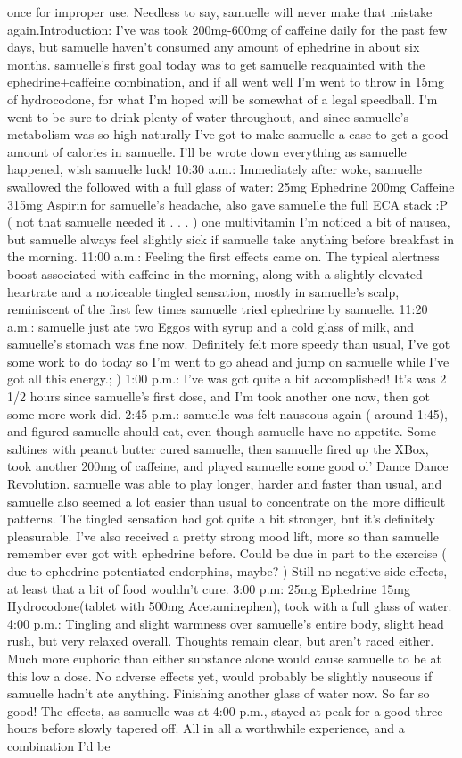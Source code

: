 \documentclass[12pt]{book}
\begin{document}
once for improper use. Needless to say, samuelle will never make that mistake again.Introduction: I've was took 200mg-600mg of caffeine daily for the past few days, but samuelle haven't consumed any amount of ephedrine in about six months. samuelle's first goal today was to get samuelle reaquainted with the ephedrine+caffeine combination, and if all went well I'm went to throw in 15mg of hydrocodone, for what I'm hoped will be somewhat of a legal speedball. I'm went to be sure to drink plenty of water throughout, and since samuelle's metabolism was so high naturally I've got to make samuelle a case to get a good amount of calories in samuelle. I'll be wrote down everything as samuelle happened, wish samuelle luck! 10:30 a.m.: Immediately after woke, samuelle swallowed the followed with a full glass of water: 25mg Ephedrine 200mg Caffeine 315mg Aspirin for samuelle's headache, also gave samuelle the full ECA stack :P ( not that samuelle needed it . . .   ) one multivitamin I'm noticed a bit of nausea, but samuelle always feel slightly sick if samuelle take anything before breakfast in the morning. 11:00 a.m.: Feeling the first effects came on. The typical alertness boost associated with caffeine in the morning, along with a slightly elevated heartrate and a noticeable tingled sensation, mostly in samuelle's scalp, reminiscent of the first few times samuelle tried ephedrine by samuelle. 11:20 a.m.: samuelle just ate two Eggos with syrup and a cold glass of milk, and samuelle's stomach was fine now. Definitely felt more speedy than usual, I've got some work to do today so I'm went to go ahead and jump on samuelle while I've got all this energy.; ) 1:00 p.m.: I've was got quite a bit accomplished! It's was 2 1/2 hours since samuelle's first dose, and I'm took another one now, then got some more work did. 2:45 p.m.: samuelle was felt nauseous again ( around 1:45), and figured samuelle should eat, even though samuelle have no appetite. Some saltines with peanut butter cured samuelle, then samuelle fired up the XBox, took another 200mg of caffeine, and played samuelle some good ol' Dance Dance Revolution. samuelle was able to play longer, harder and faster than usual, and samuelle also seemed a lot easier than usual to concentrate on the more difficult patterns. The tingled sensation had got quite a bit stronger, but it's definitely pleasurable. I've also received a pretty strong mood lift, more so than samuelle remember ever got with ephedrine before. Could be due in part to the exercise ( due to ephedrine potentiated endorphins, maybe? ) Still no negative side effects, at least that a bit of food wouldn't cure. 3:00 p.m: 25mg Ephedrine 15mg Hydrocodone(tablet with 500mg Acetaminephen), took with a full glass of water. 4:00 p.m.: Tingling and slight warmness over samuelle's entire body, slight head rush, but very relaxed overall. Thoughts remain clear, but aren't raced either. Much more euphoric than either substance alone would cause samuelle to be at this low a dose. No adverse effects yet, would probably be slightly nauseous if samuelle hadn't ate anything. Finishing another glass of water now. So far so good! The effects, as samuelle was at 4:00 p.m., stayed at peak for a good three hours before slowly tapered off. All in all a worthwhile experience, and a combination I'd be 
\end{document}
